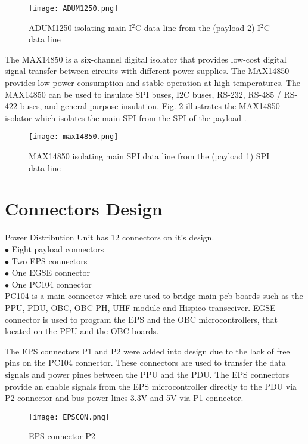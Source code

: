  \begin{figure}[h]
 	\centering
 	\texttt{[image: ADUM1250.png]}
 	\caption{ADUM1250 isolating main I$^2$C data line from the (payload 2) I$^2$C data line }
 	\label{fig: adum}
 \end{figure} 

 The MAX14850 is a six-channel digital isolator that provides low-cost digital signal transfer between circuits with different power supplies. The MAX14850 provides low power consumption and stable operation at high temperatures. The MAX14850 can be used to insulate SPI buses, I2C buses, RS-232, RS-485 / RS-422 buses, and general purpose insulation. Fig. \ref{fig: adum122} illustrates the MAX14850 isolator which isolates the main SPI from the SPI of the payload \cite{31}.

\begin{figure}[h]
	\centering
	\texttt{[image: max14850.png]}
	\caption{MAX14850 isolating main SPI data line from the (payload 1) SPI data line }
	\label{fig: adum122}
\end{figure} 

\section{Connectors Design}

Power Distribution Unit has 12 connectors on it's design. \\

$\bullet$ Eight payload connectors\\
$\bullet$ Two EPS connectors\\
$\bullet$ One EGSE connector\\
$\bullet$ One PC104 connector\\

PC104 is a main connector which are used to bridge main pcb boards such as the PPU, PDU, OBC, OBC-PH, UHF module and Hispico transceiver.
EGSE connector is used to program the EPS and the OBC microcontrollers, that located on the PPU and the OBC boards.

The EPS connectors P1 and P2 were added into design due to the lack of free pins on the PC104 connector. These connectors are used to transfer the data signals and power pines between the PPU and the PDU. The EPS connectors provide an enable signals from the EPS microcontroller directly to the PDU via P2 connector and bus power lines 3.3V and 5V via P1 connector.

  \begin{figure}[h]
  	\centering
  	\texttt{[image: EPSCON.png]}
  	\caption{EPS connector P2}
  	\label{fig: EPSCON}
  \end{figure} 

